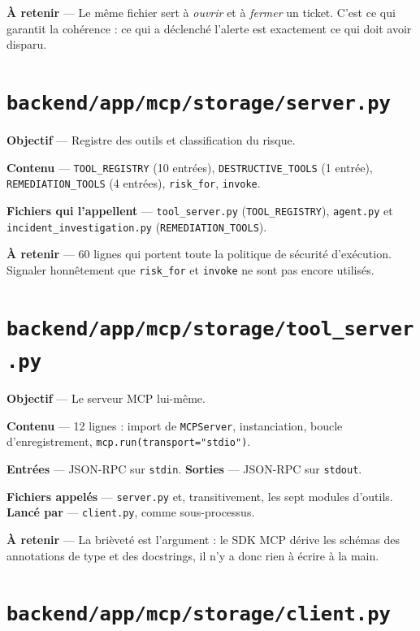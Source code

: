 \documentclass[11pt,a4paper]{report}
\newcommand{\file}[1]{\texttt{\small #1}}
\newcommand{\fn}[1]{\texttt{\small\textcolor{oasisviolet}{#1}}}
\newcommand{\cls}[1]{\texttt{\small\textcolor{oasisblue}{#1}}}
\begin{document}
\textbf{À retenir} --- Le même fichier sert à \emph{ouvrir} et à \emph{fermer}
un ticket. C'est ce qui garantit la cohérence : ce qui a déclenché l'alerte est
exactement ce qui doit avoir disparu.

\section{\file{backend/app/mcp/storage/server.py}}

\textbf{Objectif} --- Registre des outils et classification du risque.

\textbf{Contenu} --- \fn{TOOL\_REGISTRY} (10 entrées),
\texttt{DESTRUCTIVE\_TOOLS} (1 entrée), \texttt{REMEDIATION\_TOOLS} (4 entrées),
\fn{risk\_for}, \fn{invoke}.

\textbf{Fichiers qui l'appellent} --- \file{tool\_server.py}
(\fn{TOOL\_REGISTRY}), \file{agent.py} et \file{incident\_investigation.py}
(\texttt{REMEDIATION\_TOOLS}).

\textbf{À retenir} --- 60 lignes qui portent toute la politique de sécurité
d'exécution. Signaler honnêtement que \fn{risk\_for} et \fn{invoke} ne sont pas
encore utilisés.

\section{\file{backend/app/mcp/storage/tool\_server.py}}

\textbf{Objectif} --- Le serveur MCP lui-même.

\textbf{Contenu} --- 12 lignes : import de \cls{MCPServer}, instanciation,
boucle d'enregistrement, \texttt{mcp.run(transport="stdio")}.

\textbf{Entrées} --- JSON-RPC sur \texttt{stdin}.
\textbf{Sorties} --- JSON-RPC sur \texttt{stdout}.

\textbf{Fichiers appelés} --- \file{server.py} et, transitivement, les sept
modules d'outils. \textbf{Lancé par} --- \file{client.py}, comme sous-processus.

\textbf{À retenir} --- La brièveté est l'argument : le SDK MCP dérive les
schémas des annotations de type et des docstrings, il n'y a donc rien à écrire
à la main.

\section{\file{backend/app/mcp/storage/client.py}}
\end{document}
